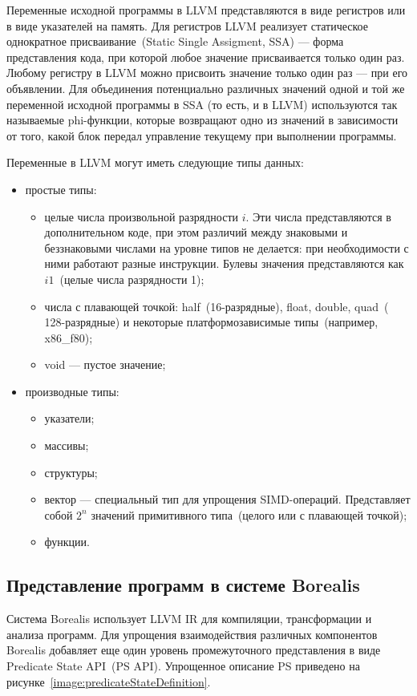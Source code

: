 Переменные исходной программы в LLVM представляются в виде регистров или в виде
указателей на память. Для регистров 
LLVM реализует статическое однократное присваивание~(Static Single Assigment, 
SSA) --- форма представления кода, при которой любое значение присваивается 
только один раз. Любому регистру в LLVM можно присвоить значение только один 
раз --- при его объявлении. Для объединения потенциально различных значений 
одной и той же переменной исходной программы в SSA (то есть, и в LLVM) 
используются так называемые phi-функции, которые возвращают одно из значений в 
зависимости от того, какой блок передал управление текущему при выполнении 
программы.

Переменные в LLVM могут иметь следующие типы данных:
\begin{itemize}
\item простые типы:
    \begin{itemize}
    \item целые числа произвольной разрядности $i$. Эти числа представляются в 
    дополнительном коде, при этом различий между знаковыми и беззнаковыми 
    числами на уровне типов не делается: при необходимости с ними работают 
    разные инструкции. Булевы значения представляются как $i1$~(целые числа разрядности 1);
    \item числа с плавающей точкой: half~(16-разрядные), float, double, quad~(
    128-разрядные) и некоторые платформозависимые типы~(например, x86\_f80);
    \item void --- пустое значение;
    \end{itemize}

\item производные типы:
    \begin{itemize}
    \item указатели;
    \item массивы;
    \item структуры;
    \item вектор --- специальный тип для упрощения SIMD-операций. Представляет 
    собой $2^n$ значений примитивного типа~(целого или с плавающей точкой);
    \item функции.
    \end{itemize}
\end{itemize}

\subsection{Представление программ в системе Borealis}
Система Borealis использует LLVM IR для компиляции, трансформации и анализа 
программ. Для упрощения взаимодействия различных компонентов Borealis 
добавляет еще один уровень промежуточного представления в виде Predicate State 
API~(PS API). Упрощенное описание PS приведено на 
рисунке~\ref{image:predicateStateDefinition}.

